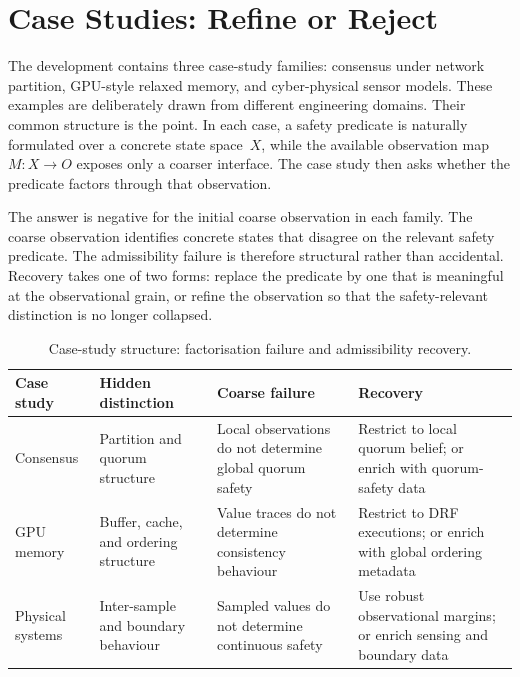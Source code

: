 %   

\section{Case Studies: Refine or Reject}

The development contains three case-study families: consensus under network
partition, GPU-style relaxed memory, and cyber-physical sensor models. These
examples are deliberately drawn from different engineering domains. Their common
structure is the point. In each case, a safety predicate is naturally formulated
over a concrete state space~\(X\), while the available observation map
\(M : X \to O\) exposes only a coarser interface. The case study then asks
whether the predicate factors through that observation.

The answer is negative for the initial coarse observation in each family. The
coarse observation identifies concrete states that disagree on the relevant
safety predicate. The admissibility failure is therefore structural rather than
accidental. Recovery takes one of two forms: replace the predicate by one that
is meaningful at the observational grain, or refine the observation so that the
safety-relevant distinction is no longer collapsed.

\begin{table}[t]
\centering
\caption{Case-study structure: factorisation failure and admissibility recovery.}
\label{tab:case-study-factorisation}
\small
\begin{tabular}{p{1.8cm}p{2.8cm}p{3.5cm}p{2.9cm}}
\hline
Case study & Hidden distinction & Coarse failure & Recovery \\
\hline
Consensus
  & Partition and quorum structure
  & Local observations do not determine global quorum safety
  & Restrict to local quorum belief; or enrich with quorum-safety data \\[4pt]
GPU memory
  & Buffer, cache, and ordering structure
  & Value traces do not determine consistency behaviour
  & Restrict to DRF executions; or enrich with global ordering metadata \\[4pt]
Physical systems
  & Inter-sample and boundary behaviour
  & Sampled values do not determine continuous safety
  & Use robust observational margins; or enrich sensing and boundary data \\
\hline
\end{tabular}
\end{table}

